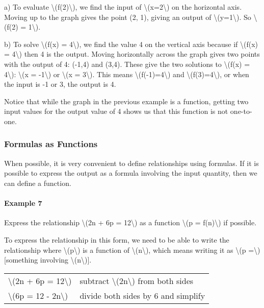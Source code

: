 a) To evaluate \textbackslash{}(f(2)\textbackslash{}), we find the input
of \textbackslash{}(x=2\textbackslash{}) on the horizontal axis. Moving
up to the graph gives the point (2, 1), giving an output of
\textbackslash{}(y=1\textbackslash{}). So \textbackslash{}(f(2) =
1\textbackslash{}).

b) To solve \textbackslash{}(f(x) = 4\textbackslash{}), we find the
value 4 on the vertical axis because if \textbackslash{}(f(x) =
4\textbackslash{}) then 4 is the output. Moving horizontally across the
graph gives two points with the output of 4: (-1,4) and (3,4). These
give the two solutions to \textbackslash{}(f(x) = 4\textbackslash{}):
\textbackslash{}(x = -1\textbackslash{}) or \textbackslash{}(x =
3\textbackslash{}). This means \textbackslash{}(f(-1)=4\textbackslash{})
and \textbackslash{}(f(3)=4\textbackslash{}), or when the input is -1 or
3, the output is 4.

Notice that while the graph in the previous example is a function,
getting two input values for the output value of 4 shows us that this
function is not one-to-one.

\hypertarget{formulas-as-functions}{%
\subsubsection{Formulas as Functions}\label{formulas-as-functions}}

When possible, it is very convenient to define relationships using
formulas. If it is possible to express the output as a formula involving
the input quantity, then we can define a function.

\hypertarget{example-7}{%
\paragraph{Example 7}\label{example-7}}

Express the relationship \textbackslash{}(2n + 6p = 12\textbackslash{})
as a function \textbackslash{}(p = f(n)\textbackslash{}) if possible.

To express the relationship in this form, we need to be able to write
the relationship where \textbackslash{}(p\textbackslash{}) is a function
of \textbackslash{}(n\textbackslash{}), which means writing it as
\textbackslash{}(p =\textbackslash{}) {[}something involving
\textbackslash{}(n\textbackslash{}){]}.

\begin{longtable}[]{@{}ll@{}}
\toprule
\endhead
\textbackslash{}(2n + 6p = 12\textbackslash{}) & subtract
\textbackslash{}(2n\textbackslash{}) from both sides\tabularnewline
\textbackslash{}(6p = 12 - 2n\textbackslash{}) & divide both sides by 6
and simplify\tabularnewline
\bottomrule
\end{longtable}

